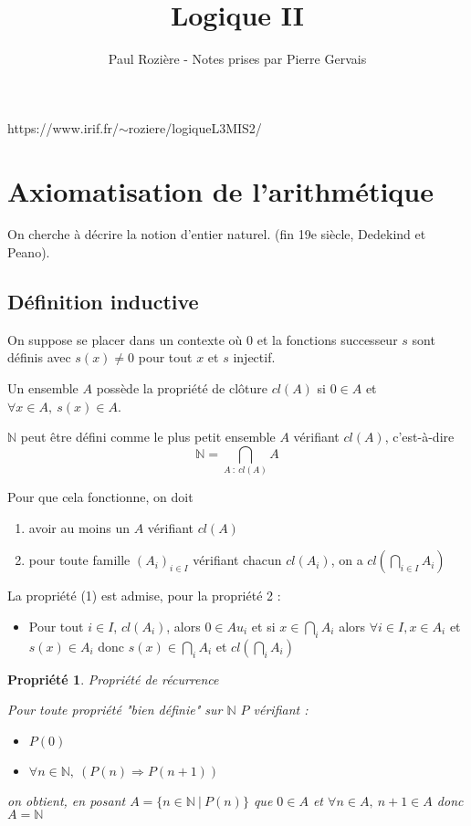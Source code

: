 \documentclass[]{article}
\title{Logique II}
\author{Paul Rozière - Notes prises par Pierre Gervais}
\newtheorem{myproperty}{Propriété}
\theoremstyle{remark}
\theoremstyle{definition}
\newcommand{\DS}{\displaystyle}
\begin{document}
\maketitle

https://www.irif.fr/$\sim$roziere/logiqueL3MIS2/

\tableofcontents

\newpage

\section{Axiomatisation de l'arithmétique}

On cherche à décrire la notion d'entier naturel. (fin 19e siècle, Dedekind et Peano).

\subsection{Définition inductive}

On suppose se placer dans un contexte où 0 et la fonctions successeur $s$ sont définis avec $s(x) \neq 0$ pour tout $x$ et $s$ injectif.

Un ensemble $A$ possède la propriété de clôture $cl(A)$ si $0 \in A$ et $\forall x \in A, ~ s(x) \in A$.

$\mathbb{N}$ peut être défini comme le plus petit ensemble $A$ vérifiant $cl(A)$, c'est-à-dire $$\mathbb{N} = \bigcap_{A ~ : ~ cl(A)} A$$

Pour que cela fonctionne, on doit
\begin{enumerate}
	\item avoir au moins un $A$ vérifiant $cl(A)$
	\item pour toute famille $(A_i)_{i \in I}$ vérifiant chacun $cl(A_i)$, on a $\DS cl\left(\bigcap_{i \in I} A_i\right)$
\end{enumerate}

La propriété (1) est admise, pour la propriété 2 :
\begin{itemize}
	\item Pour tout $i \in I$, $cl(A_i)$, alors $0 \in Au_i$ et si $x \in \bigcap_i A_i$ alors $\forall i \in I, x \in A_i$ et $s(x) \in A_i$ donc $s(x) \in \bigcap_i A_i$ et $cl\left(\bigcap_i A_i\right)$
\end{itemize}

\begin{myproperty} Propriété de récurrence
	
	Pour toute propriété "bien définie" sur $\mathbb{N}$ $P$ vérifiant :
	\begin{itemize}
		\item $P(0)$
		\item $\forall n \in \mathbb{N}, ~ (P(n) \Longrightarrow P(n+1))$
	\end{itemize}
	
	on obtient, en posant $A = \{n \in \mathbb{N} ~ | ~ P(n)\}$ que $0 \in A$ et $\forall n \in A, ~ n+1 \in A$ donc $A = \mathbb{N}$
\end{myproperty}
\end{document}
